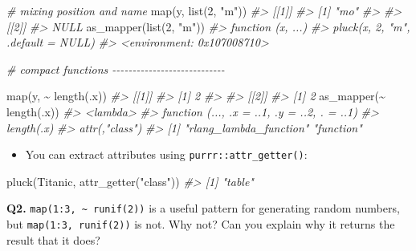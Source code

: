 \documentclass[
]{book}
\newenvironment{Shaded}{\begin{snugshade}}{\end{snugshade}}
\newcommand{\CommentTok}[1]{\textcolor[rgb]{0.56,0.35,0.01}{\textit{#1}}}
\newcommand{\DecValTok}[1]{\textcolor[rgb]{0.00,0.00,0.81}{#1}}
\newcommand{\FunctionTok}[1]{\textcolor[rgb]{0.00,0.00,0.00}{#1}}
\newcommand{\NormalTok}[1]{#1}
\newcommand{\SpecialCharTok}[1]{\textcolor[rgb]{0.00,0.00,0.00}{#1}}
\newcommand{\StringTok}[1]{\textcolor[rgb]{0.31,0.60,0.02}{#1}}
\providecommand{\tightlist}{%
  \setlength{\itemsep}{0pt}\setlength{\parskip}{0pt}}
\begin{document}
\begin{Shaded}
\begin{Highlighting}[]
\CommentTok{\# mixing position and name}
\FunctionTok{map}\NormalTok{(y, }\FunctionTok{list}\NormalTok{(}\DecValTok{2}\NormalTok{, }\StringTok{"m"}\NormalTok{))}
\CommentTok{\#\textgreater{} [[1]]}
\CommentTok{\#\textgreater{} [1] "mo"}
\CommentTok{\#\textgreater{} }
\CommentTok{\#\textgreater{} [[2]]}
\CommentTok{\#\textgreater{} NULL}
\FunctionTok{as\_mapper}\NormalTok{(}\FunctionTok{list}\NormalTok{(}\DecValTok{2}\NormalTok{, }\StringTok{"m"}\NormalTok{))}
\CommentTok{\#\textgreater{} function (x, ...) }
\CommentTok{\#\textgreater{} pluck(x, 2, "m", .default = NULL)}
\CommentTok{\#\textgreater{} \textless{}environment: 0x107008710\textgreater{}}

\CommentTok{\# compact functions {-}{-}{-}{-}{-}{-}{-}{-}{-}{-}{-}{-}{-}{-}{-}{-}{-}{-}{-}{-}{-}{-}{-}{-}{-}{-}{-}{-}}

\FunctionTok{map}\NormalTok{(y, }\SpecialCharTok{\textasciitilde{}} \FunctionTok{length}\NormalTok{(.x))}
\CommentTok{\#\textgreater{} [[1]]}
\CommentTok{\#\textgreater{} [1] 2}
\CommentTok{\#\textgreater{} }
\CommentTok{\#\textgreater{} [[2]]}
\CommentTok{\#\textgreater{} [1] 2}
\FunctionTok{as\_mapper}\NormalTok{(}\SpecialCharTok{\textasciitilde{}} \FunctionTok{length}\NormalTok{(.x))}
\CommentTok{\#\textgreater{} \textless{}lambda\textgreater{}}
\CommentTok{\#\textgreater{} function (..., .x = ..1, .y = ..2, . = ..1) }
\CommentTok{\#\textgreater{} length(.x)}
\CommentTok{\#\textgreater{} attr(,"class")}
\CommentTok{\#\textgreater{} [1] "rlang\_lambda\_function" "function"}
\end{Highlighting}
\end{Shaded}

\begin{itemize}
\tightlist
\item
  You can extract attributes using \texttt{purrr::attr\_getter()}:
\end{itemize}

\begin{Shaded}
\begin{Highlighting}[]
\FunctionTok{pluck}\NormalTok{(Titanic, }\FunctionTok{attr\_getter}\NormalTok{(}\StringTok{"class"}\NormalTok{))}
\CommentTok{\#\textgreater{} [1] "table"}
\end{Highlighting}
\end{Shaded}

\textbf{Q2.} \texttt{map(1:3,\ \textasciitilde{}\ runif(2))} is a useful pattern for generating random numbers, but \texttt{map(1:3,\ runif(2))} is not. Why not? Can you explain why it returns the result that it does?
\end{document}
